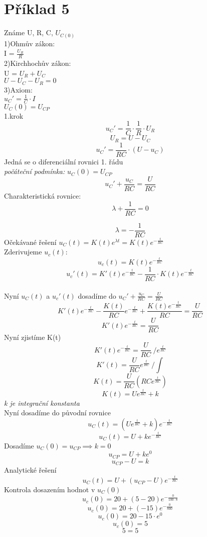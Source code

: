 \section{Příklad 5}
Známe U, R, C, $U_{C(0)}$\\
1)Ohmův zákon:\\ I = $\frac{U_{R}}{R}$\\
2)Kirchhochův zákon:\\ U = $U_{R}+U_{C}$\\ $U-U_{C}-U_{R}=0$\\
3)Axiom:\\$u_{C}'=\frac{1}{C} \cdot I$\\ $U_{C}(0)=U_{CP}$\\
1.krok\\
\[
  u_{C}'=\displaystyle\frac{1}{C} \cdot \displaystyle\frac{1}{R} \cdot U_{R}
\]
\[
  U_{R} = U-U_{C}
\]
\[
  u_{C}'=\displaystyle\frac{1}{RC} \cdot (U-u_{C})
\]
Jedná se o diferenciální rovnici 1. řádu\\
\textit{počáteční podmínka:} $u_{C}(0)=U_{CP}$\\
\[
  u_{C}'+\displaystyle\frac{u_{C}}{RC}= \displaystyle\frac{U}{RC}
\]
Charakteristická rovnice:
\[
  \lambda + \displaystyle\frac{1}{RC}=0
\]

\[
  \lambda =-\displaystyle\frac{1}{RC}
\]
Očekávané řešení $u_{C}(t)=K(t)e^{\lambda t} = K(t)e^{-\frac{t}{RC}}$\\
Zderivujeme $u_{c}(t)$:
\[
  u_{c}(t) = K(t)e^{-\frac{t}{RC}}
\]
\[
  u_{c}'(t)=K'(t)e^{-\frac{t}{RC}}- \displaystyle\frac{1}{RC} \cdot K(t)e^{-\frac{t}{RC}}
\]\\
Nyní $u_{C}(t)$ a $u_{c}'(t)$ dosadíme do $u_{C}'+\frac{u_{C}}{RC}=\frac{U}{RC}$
\[
  K'(t)e^{-\frac{t}{RC}}-\displaystyle\frac{K(t)}{RC}e^{-\frac{t}{RC}}+\displaystyle\frac{K(t)e^{-\frac{t}{RC}}}{RC}=\displaystyle\frac{U}{RC}
\]
\[
  K'(t)e^{-\frac{t}{RC}}=\displaystyle\frac{U}{RC}
\]
Nyní zjistíme K(t)
\[
  K'(t)e^{-\frac{t}{RC}}=\displaystyle\frac{U}{RC}\ /e^{\frac{t}{RC}}
\]
\[
  K'(t)=\displaystyle\frac{U}{RC}e^{\frac{t}{RC}}\ /\int{}{}
\]
\[
  K(t)=\displaystyle\frac{U}{RC}(RCe^{\frac{t}{RC}})
\]
\[
  K(t)=Ue^{\frac{t}{RC}}+k
\]
\textit{k je integrační konstanta}\\

Nyní dosadíme do původní rovnice 
\[
  u_{C}(t) = (Ue^{\frac{t}{RC}}+k)e^{-\frac{t}{RC}}
\]
\[
  u_{C}(t)=U+ke^{-\frac{t}{RC}}
\]
Dosadíme $u_{C}(0)=u_{CP}\implies k=0$
\[
  u_{CP}=U+ke^{0}
\]
\[
  u_{CP}-U=k
\]
Analytické řešení
\[
  u_{C}(t) = U + (u_{CP}-U)e^{-\frac{t}{RC}}
\]
Kontrola dosazením hodnot v $u_{C}(0)$
\[
  u_{c}(0) = 20 + (5-20)e^{-\frac{0}{100 \cdot 8}}
\]
\[
  u_{c}(0) = 20 + (-15)e^{-\frac{0}{800}}
\]
\[
  u_{c}(0) = 20 -15 \cdot e^{0}
\]
\[
  u_{c}(0) = 5 
\]
\[
  5=5
\]

